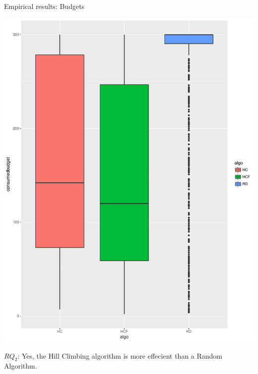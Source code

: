 \documentclass{beamer}
\begin{document}
\begin{frame}{Empirical results: Budgets}
\begin{center}
\includegraphics[angle=-90,origin=c,scale=0.2]{boxplot_budgets.pdf}
\begin{mdframed}
\textbf{$RQ_2$}: Yes, the Hill Climbing algorithm is more effecient than a Random Algorithm.
\end{mdframed}
\end{center}
\end{frame}
\end{document}
